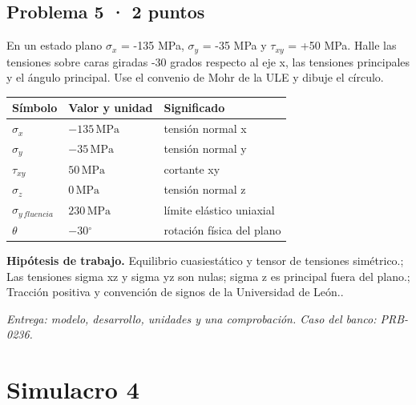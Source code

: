 \par\medskip\noindent\begin{minipage}{\linewidth}

\section{Problema 5 · 2 puntos}

En un estado plano $\sigma_x$ = -135 MPa, $\sigma_y$ = -35 MPa y $\tau_{xy}$ = +50 MPa. Halle las tensiones sobre caras giradas -30 grados respecto al eje x, las tensiones principales y el ángulo principal. Use el convenio de Mohr de la ULE y dibuje el círculo.

\par\medskip\noindent\begin{tabular}{@{}p{.18\linewidth}p{.26\linewidth}p{.48\linewidth}@{}}
\toprule Símbolo & Valor y unidad & Significado\\\midrule
$\sigma_{x}$ & $-135\,\mathrm{MPa}$ & tensión normal x\\
$\sigma_{y}$ & $-35\,\mathrm{MPa}$ & tensión normal y\\
$\tau_{xy}$ & $50\,\mathrm{MPa}$ & cortante xy\\
$\sigma_{z}$ & $0\,\mathrm{MPa}$ & tensión normal z\\
$\sigma_{y\,fluencia}$ & $230\,\mathrm{MPa}$ & límite elástico uniaxial\\
$\theta$ & $-30{}^{\circ}$ & rotación física del plano\\
\bottomrule\end{tabular}\par\medskip



\par\textbf{Hipótesis de trabajo.} Equilibrio cuasiestático y tensor de tensiones simétrico.; Las tensiones sigma xz y sigma yz son nulas; sigma z es principal fuera del plano.; Tracción positiva y convención de signos de la Universidad de León..

\par\textit{Entrega: modelo, desarrollo, unidades y una comprobación. Caso del banco: PRB-0236.}\end{minipage}\par\medskip


\chapter{Simulacro 4}


